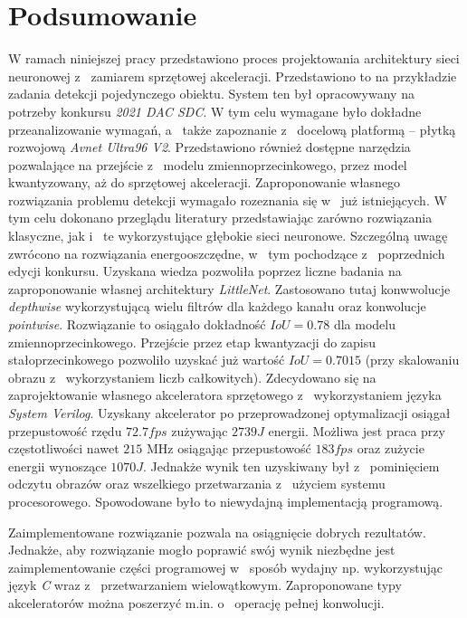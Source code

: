 \chapter{Podsumowanie}
\label{cha:Podsumowanie}


W ramach niniejszej pracy przedstawiono proces projektowania architektury sieci neuronowej z~ zamiarem sprzętowej akceleracji. 
Przedstawiono to na przykładzie zadania detekcji pojedynczego obiektu. 
System ten był opracowywany na potrzeby konkursu \emph{2021 DAC SDC}. 
W tym celu wymagane było dokładne przeanalizowanie wymagań, a~ także zapoznanie z~ docelową platformą -- płytką rozwojową \emph{Avnet Ultra96 V2}. 
Przedstawiono również dostępne narzędzia pozwalające na przejście z~ modelu zmiennoprzecinkowego, przez model kwantyzowany, aż do sprzętowej akceleracji.
Zaproponowanie własnego rozwiązania problemu detekcji wymagało rozeznania się w~ już istniejących. 
W tym celu dokonano przeglądu literatury przedstawiając zarówno rozwiązania klasyczne, jak i~ te wykorzystujące głębokie sieci neuronowe. 
Szczególną uwagę zwrócono na rozwiązania energooszczędne, w~ tym pochodzące z~ poprzednich edycji konkursu.
Uzyskana wiedza pozwoliła poprzez liczne badania na zaproponowanie własnej architektury \emph{LittleNet}. 
Zastosowano tutaj konwwolucje \emph{depthwise} wykorzystującą wielu filtrów dla każdego kanału oraz konwolucje \emph{pointwise}.
Rozwiązanie to osiągało dokładność $IoU = 0.78$ dla modelu zmiennoprzecinkowego.
Przejście przez etap kwantyzacji do zapisu stałoprzecinkowego pozwoliło uzyskać już wartość $IoU = 0.7015$ (przy skalowaniu obrazu z~ wykorzystaniem liczb całkowitych). 
Zdecydowano się na zaprojektowanie własnego akceleratora sprzętowego z~ wykorzystaniem języka \emph{System Verilog}. 
Uzyskany akcelerator po przeprowadzonej optymalizacji osiągał przepustowość rzędu $72.7 fps$ zużywając $2739 J$ energii.
Możliwa jest praca przy częstotliwości nawet $215$ MHz osiągając przepustowość $183 fps$ oraz zużycie energii wynoszące $1070 J$. 
Jednakże wynik ten uzyskiwany był z~ pominięciem odczytu obrazów oraz wszelkiego przetwarzania z~ użyciem systemu procesorowego.
Spowodowane było to niewydajną implementacją programową.

Zaimplementowane rozwiązanie pozwala na osiągnięcie dobrych rezultatów. 
Jednakże, aby rozwiązanie mogło poprawić swój wynik niezbędne jest zaimplementowanie części programowej w~ sposób wydajny np. wykorzystując język \emph{C} wraz z~ przetwarzaniem wielowątkowym.
Zaproponowane typy akceleratorów można poszerzyć m.in. o~ operację pełnej konwolucji.
